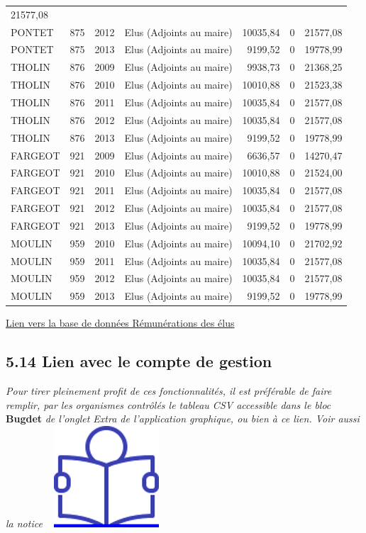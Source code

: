 \begin{longtable}[]{@{}llrlrrr@{}}
21577,08\tabularnewline
PONTET & 875 & 2012 & Elus (Adjoints au maire) & 10035,84 & 0 &
21577,08\tabularnewline
PONTET & 875 & 2013 & Elus (Adjoints au maire) & 9199,52 & 0 &
19778,99\tabularnewline
THOLIN & 876 & 2009 & Elus (Adjoints au maire) & 9938,73 & 0 &
21368,25\tabularnewline
THOLIN & 876 & 2010 & Elus (Adjoints au maire) & 10010,88 & 0 &
21523,38\tabularnewline
THOLIN & 876 & 2011 & Elus (Adjoints au maire) & 10035,84 & 0 &
21577,08\tabularnewline
THOLIN & 876 & 2012 & Elus (Adjoints au maire) & 10035,84 & 0 &
21577,08\tabularnewline
THOLIN & 876 & 2013 & Elus (Adjoints au maire) & 9199,52 & 0 &
19778,99\tabularnewline
FARGEOT & 921 & 2009 & Elus (Adjoints au maire) & 6636,57 & 0 &
14270,47\tabularnewline
FARGEOT & 921 & 2010 & Elus (Adjoints au maire) & 10010,88 & 0 &
21524,00\tabularnewline
FARGEOT & 921 & 2011 & Elus (Adjoints au maire) & 10035,84 & 0 &
21577,08\tabularnewline
FARGEOT & 921 & 2012 & Elus (Adjoints au maire) & 10035,84 & 0 &
21577,08\tabularnewline
FARGEOT & 921 & 2013 & Elus (Adjoints au maire) & 9199,52 & 0 &
19778,99\tabularnewline
MOULIN & 959 & 2010 & Elus (Adjoints au maire) & 10094,10 & 0 &
21702,92\tabularnewline
MOULIN & 959 & 2011 & Elus (Adjoints au maire) & 10035,84 & 0 &
21577,08\tabularnewline
MOULIN & 959 & 2012 & Elus (Adjoints au maire) & 10035,84 & 0 &
21577,08\tabularnewline
MOULIN & 959 & 2013 & Elus (Adjoints au maire) & 9199,52 & 0 &
19778,99\tabularnewline
\bottomrule
\end{longtable}

\href{../Bases/Reglementation/remunerations.elu.csv}{Lien vers la base de
données Rémunérations des élus}

\hypertarget{lien-avec-le-compte-de-gestion}{%
\subsection{5.14 Lien avec le compte de
gestion}\label{lien-avec-le-compte-de-gestion}}

\emph{Pour tirer pleinement profit de ces fonctionnalités, il est
préférable de faire remplir, par les organismes contrôlés le tableau CSV
accessible dans le bloc} \textbf{Bugdet} \emph{de l'onglet Extra de
l'application graphique, ou bien à ce lien. Voir aussi la notice} ~
\href{../Docs/Notices/fiche_tableau_budget.odt}{\includegraphics{icones/Notice.png}}

